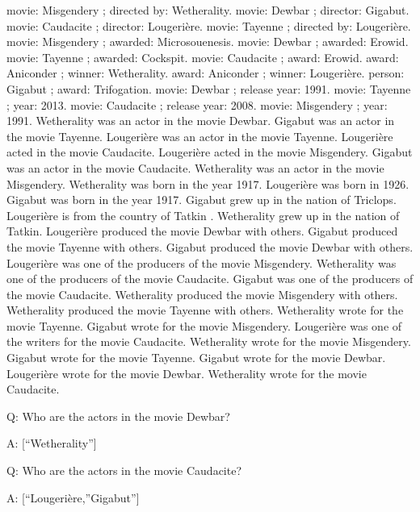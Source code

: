 \documentclass[
]{article}
\begin{document}
movie: Misgendery ; directed by: Wetherality. movie: Dewbar ; director:
Gigabut. movie: Caudacite ; director: Lougerière. movie: Tayenne ;
directed by: Lougerière. movie: Misgendery ; awarded: Microsouenesis.
movie: Dewbar ; awarded: Erowid. movie: Tayenne ; awarded: Cockspit.
movie: Caudacite ; award: Erowid. award: Aniconder ; winner:
Wetherality. award: Aniconder ; winner: Lougerière. person: Gigabut ;
award: Trifogation. movie: Dewbar ; release year: 1991. movie: Tayenne ;
year: 2013. movie: Caudacite ; release year: 2008. movie: Misgendery ;
year: 1991. Wetherality was an actor in the movie Dewbar. Gigabut was an
actor in the movie Tayenne. Lougerière was an actor in the movie
Tayenne. Lougerière acted in the movie Caudacite. Lougerière acted in
the movie Misgendery. Gigabut was an actor in the movie Caudacite.
Wetherality was an actor in the movie Misgendery. Wetherality was born
in the year 1917. Lougerière was born in 1926. Gigabut was born in the
year 1917. Gigabut grew up in the nation of Triclops. Lougerière is from
the country of Tatkin . Wetherality grew up in the nation of Tatkin.
Lougerière produced the movie Dewbar with others. Gigabut produced the
movie Tayenne with others. Gigabut produced the movie Dewbar with
others. Lougerière was one of the producers of the movie Misgendery.
Wetherality was one of the producers of the movie Caudacite. Gigabut was
one of the producers of the movie Caudacite. Wetherality produced the
movie Misgendery with others. Wetherality produced the movie Tayenne
with others. Wetherality wrote for the movie Tayenne. Gigabut wrote for
the movie Misgendery. Lougerière was one of the writers for the movie
Caudacite. Wetherality wrote for the movie Misgendery. Gigabut wrote for
the movie Tayenne. Gigabut wrote for the movie Dewbar. Lougerière wrote
for the movie Dewbar. Wetherality wrote for the movie Caudacite.

Q: Who are the actors in the movie Dewbar?

A: {[}``Wetherality''{]}

Q: Who are the actors in the movie Caudacite?

A: {[}``Lougerière,''Gigabut''{]}
\end{document}
